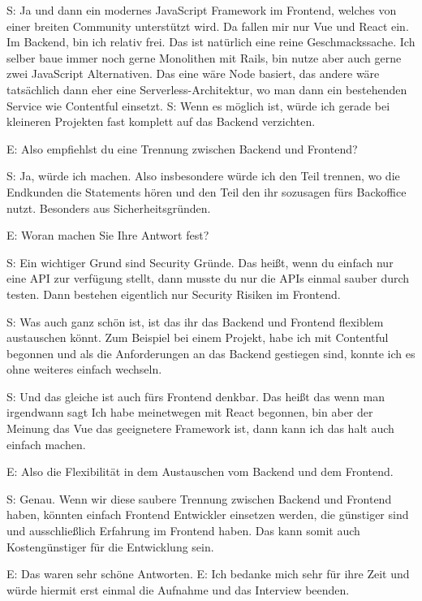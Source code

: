 S: Ja und dann ein modernes JavaScript Framework im Frontend, welches von einer breiten Community unterstützt wird. Da fallen mir nur Vue und React ein. Im Backend, bin ich relativ frei. Das ist natürlich eine reine Geschmackssache. Ich selber baue immer noch gerne Monolithen mit Rails, bin nutze aber auch gerne zwei JavaScript Alternativen. Das eine wäre Node basiert, das andere wäre tatsächlich dann eher eine Serverless-Architektur, wo man dann ein bestehenden Service wie Contentful einsetzt. 
S: Wenn es möglich ist, würde ich gerade bei kleineren Projekten fast komplett auf das Backend verzichten.

E: Also empfiehlst du eine Trennung zwischen Backend und Frontend?

S: Ja, würde ich machen. Also insbesondere würde ich den Teil trennen, wo die Endkunden die Statements hören und den Teil den ihr sozusagen fürs Backoffice nutzt. Besonders aus Sicherheitsgründen.

E: Woran machen Sie Ihre Antwort fest? 

S: Ein wichtiger Grund sind Security Gründe. Das heißt, wenn du einfach nur eine API zur verfügung stellt, dann musste du nur die APIs einmal sauber durch testen. Dann bestehen eigentlich nur Security Risiken im Frontend.

S: Was auch ganz schön ist, ist das ihr das Backend und Frontend flexiblem austauschen könnt. Zum Beispiel bei einem Projekt, habe ich mit Contentful begonnen und als die Anforderungen an das Backend gestiegen sind, konnte ich es ohne weiteres einfach wechseln.

S: Und das gleiche ist auch fürs Frontend denkbar. Das heißt das wenn man irgendwann sagt Ich habe meinetwegen mit React begonnen, bin aber der Meinung das Vue das geeignetere Framework ist, dann kann ich das halt auch einfach machen.

E: Also die Flexibilität in dem Austauschen vom Backend und dem Frontend.

S: Genau. Wenn wir diese saubere Trennung zwischen Backend und Frontend haben, könnten einfach Frontend Entwickler einsetzen werden, die günstiger sind und ausschließlich Erfahrung im Frontend haben. Das kann somit auch Kostengünstiger für die Entwicklung sein.

E: Das waren sehr schöne Antworten.
E: Ich bedanke mich sehr für ihre Zeit und würde hiermit erst einmal die Aufnahme und das Interview beenden.